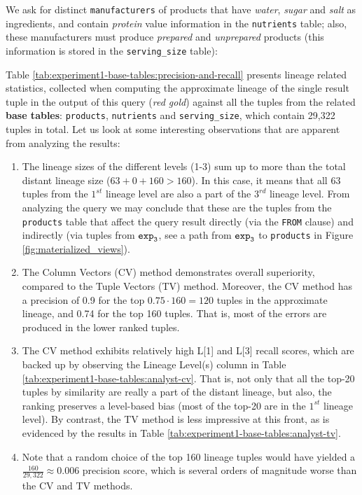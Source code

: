 \begin{experiment-withrun}\label{advanced-experiment:1}
We ask for distinct \texttt{manufacturers} of products that have \textit{water}, \textit{sugar} and \textit{salt} as  ingredients, and contain \textit{protein} value information in the \texttt{nutrients} table; also, these manufacturers must produce \textit{prepared} and \textit{unprepared} products (this information is stored in the \texttt{serving\_size} table):


Table \ref{tab:experiment1-base-tables:precision-and-recall} presents lineage related statistics, collected when computing the approximate lineage of the single result tuple in the output of this query (\textit{red gold}) against all the tuples from the related \textbf{base tables}: \texttt{products}, \texttt{nutrients} and \texttt{serving\_size}, which contain 29,322 tuples in total. Let us look at some interesting observations that are apparent from analyzing the results:
\begin{enumerate}
    \item The lineage sizes of the different levels (1-3) sum up to more than the total distant lineage size ($63 + 0 + 160 > 160$). In this case, it means that all 63 tuples from the $1^{st}$ lineage level are also a part of the $3^{rd}$ lineage level. From analyzing the query we may conclude that these are the tuples from the \texttt{products} table that affect the query result directly (via the \texttt{FROM} clause) and indirectly (via tuples from $\texttt{exp}\sb\texttt{3}$, see a path from $\texttt{exp}\sb\texttt{3}$ to \texttt{products} in Figure \ref{fig:materialized_views}).
    \item The Column Vectors (CV) method demonstrates overall superiority, compared to the Tuple Vectors (TV) method. Moreover, the  CV method has a precision of 0.9 for the top $0.75\cdot160 = 120$ tuples in the approximate lineage, and 0.74 for the top 160 tuples. That is, most of the errors are produced in the lower ranked tuples.
    \item The CV method exhibits relatively high L[1] and L[3] recall scores, which are backed up by observing the Lineage Level(s) column in Table \ref{tab:experiment1-base-tables:analyst-cv}. That is, not only that all the top-20 tuples by similarity are really a part of the distant lineage, but also, the ranking preserves a level-based bias (most of the top-20 are in the $1^{st}$ lineage level). By contrast, the TV method is less impressive at this front, as is evidenced by the results in Table \ref{tab:experiment1-base-tables:analyst-tv}.
    \item Note that a random choice of the top 160 lineage tuples would have yielded a $\frac{160}{29,322} \approx 0.006$ precision score, which is several orders of magnitude worse than the CV and TV methods. 
\end{enumerate}


\end{experiment-withrun}
